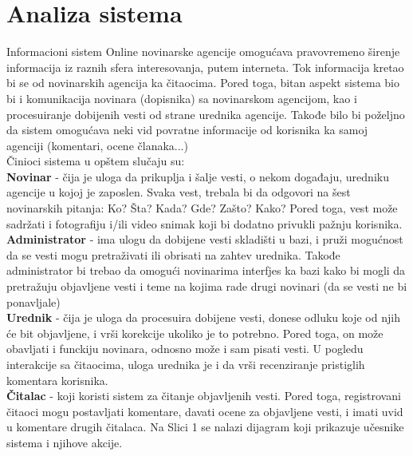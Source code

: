 \documentclass{article}
\begin{document}
\section{Analiza sistema}
Informacioni sistem Online novinarske agencije omogućava pravovremeno širenje informacija iz raznih sfera interesovanja, putem interneta. Tok informacija kretao bi se od novinarskih agencija ka čitaocima. Pored toga, bitan aspekt sistema bio bi i komunikacija novinara (dopisnika) sa novinarskom agencijom, kao i procesuiranje dobijenih vesti od strane urednika agencije. Takođe bilo bi poželjno da sistem omogućava neki vid povratne informacije od korisnika ka samoj agenciji (komentari, ocene članaka...)  \\
\indent Činioci sistema u opštem slučaju su: \\
\indent \textbf{Novinar} - čija je uloga da prikuplja i šalje vesti, o nekom događaju, uredniku agencije u kojoj je zaposlen. Svaka vest, trebala bi da odgovori na šest novinarskih pitanja: Ko? Šta? Kada? Gde? Zašto? Kako? Pored toga, vest može sadržati i fotografiju i/ili video snimak koji bi dodatno privukli pažnju korisnika. \\
\indent \textbf{Administrator} - ima ulogu da dobijene vesti skladišti u bazi, i pruži mogućnost da se vesti mogu pretraživati ili obrisati na zahtev urednika. Takođe administrator bi trebao da omogući novinarima interfjes ka bazi kako bi mogli da pretražuju objavljene vesti i teme na kojima rade drugi novinari (da se vesti ne bi ponavljale) \\
\indent \textbf{Urednik} - čija je uloga da procesuira dobijene vesti, donese odluku koje od njih će bit objavljene, i vrši korekcije ukoliko je to potrebno. Pored toga, on može obavljati i funckiju novinara, odnosno može i sam pisati vesti. U pogledu interakcije sa čitaocima, uloga urednika je i da vrši recenziranje pristiglih komentara korisnika. \\
\indent \textbf{Čitalac} - koji koristi sistem za čitanje objavljenih vesti. Pored toga, registrovani čitaoci mogu postavljati komentare, davati ocene za objavljene vesti, i imati uvid u komentare drugih čitalaca.
\indent Na Slici 1 se nalazi dijagram koji prikazuje učesnike sistema i njihove akcije.

\newpage
\end{document}
